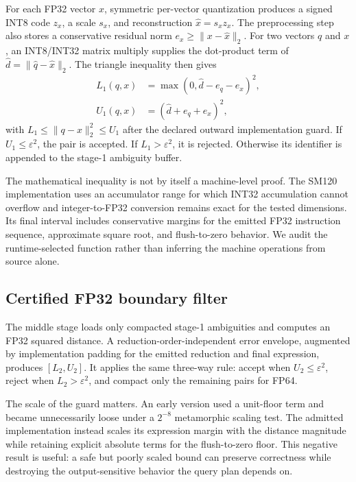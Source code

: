 \documentclass[sigconf,review,anonymous]{acmart}
\begin{document}
For each FP32 vector $x$, symmetric per-vector quantization produces a signed
INT8 code $z_x$, a scale $s_x$, and reconstruction
$\widehat{x}=s_xz_x$.  The preprocessing step also stores a conservative
residual norm $e_x\geq\lVert x-\widehat{x}\rVert_2$.  For two vectors $q$ and
$x$, an INT8/INT32 matrix multiply supplies the dot-product term of
$\widehat d=\lVert\widehat q-\widehat x\rVert_2$.  The triangle inequality
then gives
\begin{align}
  L_1(q,x) &= \max(0,\widehat d-e_q-e_x)^2,\\
  U_1(q,x) &= (\widehat d+e_q+e_x)^2,
\end{align}
with $L_1\leq\lVert q-x\rVert_2^2\leq U_1$ after the declared outward
implementation guard.  If $U_1\leq\varepsilon^2$, the pair is accepted.  If
$L_1>\varepsilon^2$, it is rejected.  Otherwise its identifier is appended to
the stage-1 ambiguity buffer.

The mathematical inequality is not by itself a machine-level proof.  The
SM120 implementation uses an accumulator range for which INT32 accumulation
cannot overflow and integer-to-FP32 conversion remains exact for the tested
dimensions.  Its final interval includes conservative margins for the emitted
FP32 instruction sequence, approximate square root, and flush-to-zero
behavior.  We audit the runtime-selected function rather than inferring the
machine operations from source alone.

\subsection{Certified FP32 boundary filter}

The middle stage loads only compacted stage-1 ambiguities and computes an FP32
squared distance.  A reduction-order-independent error envelope, augmented by
implementation padding for the emitted reduction and final expression,
produces $[L_2,U_2]$.  It applies the same three-way rule: accept when
$U_2\leq\varepsilon^2$, reject when $L_2>\varepsilon^2$, and compact only the
remaining pairs for FP64.

The scale of the guard matters.  An early version used a unit-floor term and
became unnecessarily loose under a $2^{-8}$ metamorphic scaling test.  The
admitted implementation instead scales its expression margin with the
distance magnitude while retaining explicit absolute terms for the
flush-to-zero floor.  This negative result is useful: a safe but poorly scaled
bound can preserve correctness while destroying the output-sensitive behavior
the query plan depends on.
\end{document}
